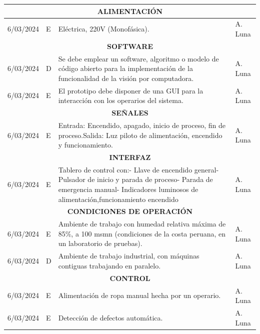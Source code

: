 \begin{longtable}{|c|p{4.5em}|p{22.5em}|p{6em}|}
	\hline
	\multicolumn{4}{|p{37.5em}|}{\textbf{ALIMENTACIÓN}} \bigstrut\\
	\hline
	6/03/2024 & E     & Eléctrica, 220V (Monofásica). & A. Luna \bigstrut\\
	\hline
	\multicolumn{4}{|p{37.5em}|}{\textbf{SOFTWARE}} \bigstrut\\
	\hline
	6/03/2024 & D     & Se debe emplear un software, algoritmo o modelo de código abierto para la implementación de la funcionalidad de la visión por computadora. & A. Luna \bigstrut\\
	\hline
	6/03/2024 & E     & El prototipo debe disponer de una GUI para la interacción con los operarios del sistema.  & A. Luna \bigstrut\\
	\hline
	\multicolumn{4}{|p{37.5em}|}{\textbf{SEÑALES}} \bigstrut\\
	\hline
	6/03/2024 & E     & Entrada: Encendido, apagado, inicio de proceso, fin de proceso.\newline{}Salida: Luz piloto de alimentación, encendido y funcionamiento. & A. Luna \bigstrut\\
	\hline
	\multicolumn{4}{|p{37.5em}|}{\textbf{INTERFAZ}} \bigstrut\\
	\hline
	6/03/2024 & E     & Tablero de control con:\newline{}- Llave de encendido general\newline{}- Pulsador de inicio y parada de proceso\newline{}- Parada de emergencia manual\newline{}- Indicadores luminosos de alimentación,funcionamiento encendido & A. Luna \bigstrut\\
	\hline
	\multicolumn{4}{|p{37.5em}|}{\textbf{CONDICIONES DE OPERACIÓN}} \bigstrut\\
	\hline
	6/03/2024 & E     & Ambiente de trabajo con humedad relativa máxima de 85\%, a 100 msmn (condiciones de la costa peruana, en un laboratorio de pruebas). & A. Luna \bigstrut\\
	\hline
	6/03/2024 & D     & Ambiente de trabajo industrial, con máquinas contiguas trabajando en paralelo. & A. Luna \bigstrut\\
	\hline
	\multicolumn{4}{|p{37.5em}|}{\textbf{CONTROL}} \bigstrut\\
	\hline
	6/03/2024 & E     & Alimentación de ropa manual hecha por un operario. & A. Luna \bigstrut\\
	\hline
	6/03/2024 & E     & Detección de defectos automática. & A. Luna \bigstrut\\

\end{longtable}
